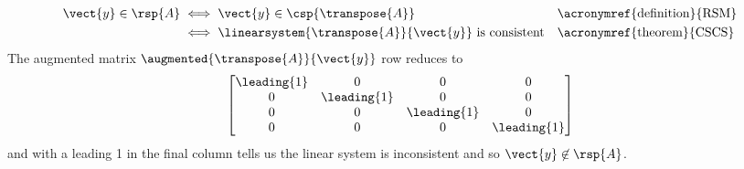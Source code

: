 \begin{align*}
\vect{y}\in\rsp{A}
&\iff\vect{y}\in\csp{\transpose{A}}&&\text{\acronymref{definition}{RSM}}\\
&\iff\linearsystem{\transpose{A}}{\vect{y}}\text{ is consistent}&&\text{\acronymref{theorem}{CSCS}}
\end{align*}
%
The augmented matrix $\augmented{\transpose{A}}{\vect{y}}$ row reduces to
%
\begin{align*}
\begin{bmatrix}
 \leading{1} & 0 & 0 & 0 \\
 0 & \leading{1} & 0 & 0 \\
 0 & 0 & \leading{1} & 0 \\
 0 & 0 & 0 & \leading{1}
\end{bmatrix}
\end{align*}
%
and with a leading 1 in the final column  tells us the linear system is inconsistent and so $\vect{y}\not\in\rsp{A}$.
